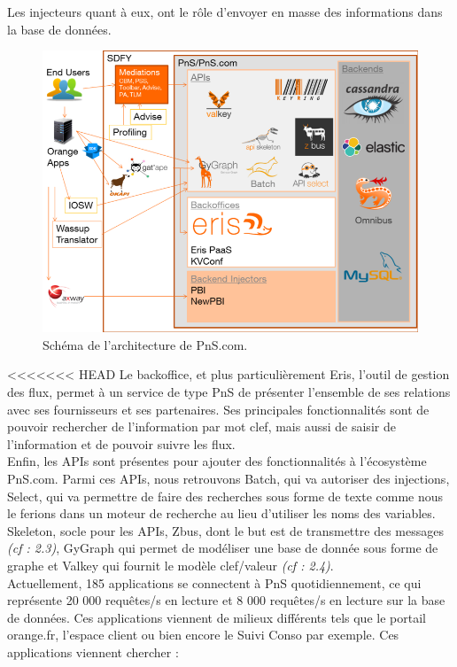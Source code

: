 Les injecteurs quant à eux, ont le rôle d'envoyer en masse des informations dans la base de données.\\
\begin{figure}[htp]
  \centering
  \includegraphics[width=15cm]{images/pns/psn.png}
  \caption{Schéma de l'architecture de PnS.com.}
  \label{pns}
\end{figure}


<<<<<<< HEAD
Le backoffice, et plus particulièrement Eris, l'outil de gestion des flux, permet à un service de type PnS de présenter l'ensemble de ses relations avec ses fournisseurs et ses partenaires. Ses principales fonctionnalités sont de pouvoir rechercher de l'information par mot clef, mais aussi de saisir de l'information et de pouvoir suivre les flux.\\

Enfin, les APIs sont présentes pour ajouter des fonctionnalités à l'écosystème PnS.com. Parmi ces APIs, nous retrouvons Batch, qui va autoriser des injections, Select, qui va permettre de faire des recherches sous forme de texte comme nous le ferions dans un moteur de recherche au lieu d'utiliser les noms des variables. Skeleton, socle pour les APIs, Zbus, dont le but est de transmettre des messages \textit{(cf : 2.3)}, GyGraph qui permet de modéliser une base de donnée sous forme de graphe et Valkey qui fournit le modèle clef/valeur \textit{(cf : 2.4)}.\\

Actuellement, 185 applications se connectent à PnS quotidiennement, ce qui représente 20 000 requêtes/s en lecture et 8 000 requêtes/s en lecture sur la base de données. Ces applications viennent de milieux différents tels que le portail orange.fr, l'espace client ou bien encore le Suivi Conso par exemple. Ces applications viennent chercher : 

